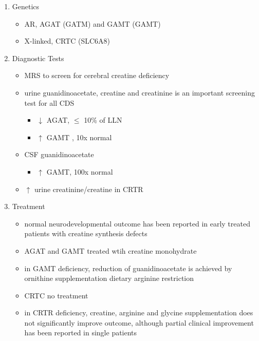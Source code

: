 \documentclass{scrartcl}
\begin{document}
\begin{enumerate}
\item Genetics
\label{sec:org1952e96}
\begin{itemize}
\item AR, AGAT (GATM) and GAMT (GAMT)
\item X-linked, CRTC (SLC6A8)
\end{itemize}
\item Diagnostic Tests
\label{sec:orgd8db6ad}
\begin{itemize}
\item MRS to screen for cerebral creatine deficiency
\item urine guanidinoacetate, creatine and creatinine is an important
screening test for all CDS
\begin{itemize}
\item \(\downarrow\) AGAT, \(\le\) 10\% of LLN
\item \(\uparrow\) GAMT , 10x normal
\end{itemize}
\item CSF guanidinoacetate
\begin{itemize}
\item \(\uparrow\) GAMT, 100x normal
\end{itemize}
\item \(\uparrow\) urine creatinine/creatine in CRTR
\end{itemize}

\item Treatment
\label{sec:org49110af}
\begin{itemize}
\item normal neurodevelopmental outcome has been reported in early treated
patients with creatine synthesis defects
\item AGAT and GAMT treated wtih creatine monohydrate
\item in GAMT deficiency, reduction of guanidinoacetate is achieved by
ornithine supplementation \textpm{} dietary arginine restriction
\item CRTC no treatment
\item in CRTR deficiency, creatine, arginine and glycine supplementation
does not significantly improve outcome, although partial clinical
improvement has been reported in single patients
\end{itemize}
\end{enumerate}
\end{document}

